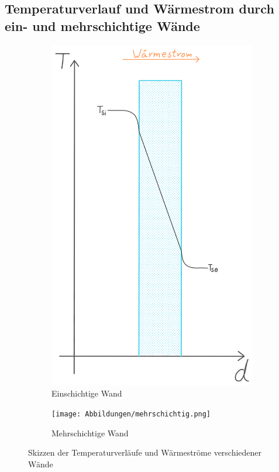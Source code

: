 \subsection{Temperaturverlauf und Wärmestrom durch ein- und mehrschichtige Wände}
\begin{figure}[H]
	\centering
	\begin{subfigure}[c]{0.303\textwidth}
		\includegraphics[width=\textwidth]{Abbildungen/einschichtig.png}
		\caption{Einschichtige Wand}
	\end{subfigure}
	\begin{subfigure}[c]{0.497\textwidth}
		\texttt{[image: Abbildungen/mehrschichtig.png]}
		\caption{Mehrschichtige Wand}
	\end{subfigure}
	\caption{Skizzen der Temperaturverläufe und Wärmeströme verschiedener Wände}
	\label{fig:230515_Temp-verlauf}
\end{figure}

